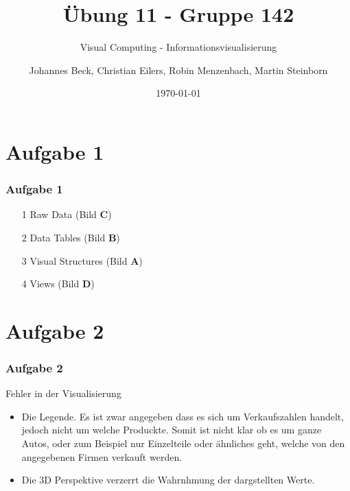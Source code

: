 \documentclass[accentcolor=tud9c,colorbacktitle,inverttitle,landscape,german,presentation,t]{tudbeamer}
\begin{document}
\title{\"Ubung 11 - Gruppe 142}
\subtitle{Visual Computing - Informationsvisualisierung}


\author[Johannes Beck, Christian Eilers, Robin Menzenbach, Martin Steinborn]{Johannes Beck, Christian Eilers, Robin Menzenbach, Martin Steinborn}


\date{\today}

\begin{titleframe}
\end{titleframe}

\section{Aufgabe 1}
	\begin{frame}
		\frametitle{Aufgabe 1}
		\begin{itemize}
			\item[1] Raw Data (Bild \textbf{C})
			\item[2] Data Tables (Bild \textbf{B})
			\item[3] Visual Structures (Bild \textbf{A})
			\item[4] Views (Bild \textbf{D})
		\end{itemize}
	\end{frame}
\section{Aufgabe 2}
\begin{frame}
	\frametitle{Aufgabe 2}
	Fehler in der Visualisierung
	\begin{itemize}
	\item Die Legende. Es ist zwar angegeben dass es sich um Verkaufszahlen handelt, jedoch nicht um welche Produckte. Somit ist nicht klar ob es um ganze Autos, oder zum Beispiel nur Einzelteile oder ähnliches geht, welche von den angegebenen Firmen verkauft werden.
	\item Die 3D Perspektive verzerrt die Wahrnhmung der dargstellten Werte.
	\end{itemize}
\end{frame}
\end{document}
